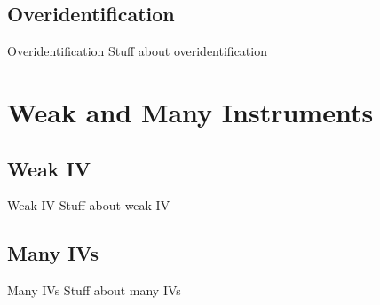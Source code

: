 \documentclass{beamer}
\begin{document}
\subsection{Overidentification}
\begin{frame}{Overidentification}
Stuff about overidentification
\end{frame}

\section{Weak and Many Instruments}

\subsection{Weak IV}
\begin{frame}{Weak IV}
Stuff about weak IV
\end{frame}

\subsection{Many IVs}
\begin{frame}{Many IVs}
Stuff about many IVs
\end{frame}
\end{document}
